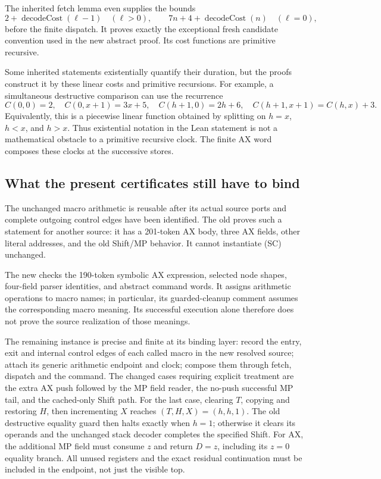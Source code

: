 The inherited fetch lemma even supplies the bounds
\[
 2+\operatorname{decodeCost}(\ell-1)\quad(\ell>0),\qquad
 7n+4+\operatorname{decodeCost}(n)\quad(\ell=0),
\]
before the finite dispatch.  It proves exactly the exceptional fresh
candidate convention used in the new abstract proof.  Its cost functions
are primitive recursive.

Some inherited statements existentially quantify their duration, but the
proofs construct it by these linear costs and primitive recursions.  For
example, a simultaneous destructive comparison can use the recurrence
\[
 C(0,0)=2,\quad C(0,x+1)=3x+5,\quad
 C(h+1,0)=2h+6,\quad C(h+1,x+1)=C(h,x)+3.
\]
Equivalently, this is a piecewise linear function obtained by splitting
on $h=x$, $h<x$, and $h>x$.  Thus existential notation in the Lean
statement is not a mathematical obstacle to a primitive recursive clock.
The finite AX word composes these clocks at the successive stores.

\subsection{What the present certificates still have to bind}

The unchanged macro arithmetic is reusable after its actual source ports
and complete outgoing control edges have been identified.  The old
 proves such a statement for
another source: it has a 201-token AX body, three AX fields, other literal
addresses, and the old Shift/MP behavior.  It cannot instantiate (SC)
unchanged.

The new  checks the 190-token symbolic AX
expression, selected node shapes, four-field parser identities, and
abstract command words.  It assigns arithmetic operations to macro names;
in particular, its guarded-cleanup comment assumes the corresponding
macro meaning.  Its successful execution alone therefore does not prove
the source realization of those meanings.

The remaining instance is precise and finite at its binding layer:
record the entry, exit and internal control edges of each called macro
in the new resolved source; attach its generic arithmetic endpoint and
clock; compose them through fetch, dispatch and the command.  The changed
cases requiring explicit treatment are the extra AX push followed by the
MP field reader, the no-push successful MP tail, and the cached-only Shift
path.  For the last case, clearing $T$, copying and restoring $H$, then
incrementing $X$ reaches $(T,H,X)=(h,h,1)$.  The old destructive equality
guard then halts exactly when $h=1$; otherwise it clears its operands and
the unchanged stack decoder completes the specified Shift.  For AX,
the additional MP field must consume $z$ and return $D=z$, including its
$z=0$ equality branch.  All unused registers and the exact residual
continuation must be included in the endpoint, not just the visible top.


